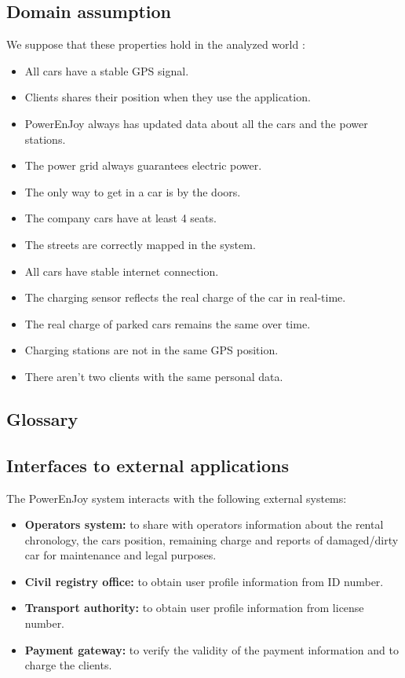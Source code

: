 \subsection{Domain assumption}
We suppose that these properties hold in the analyzed world :
\begin{itemize}
\item All cars have a stable GPS signal.
\item Clients shares their position when they use the application.
\item PowerEnJoy always has updated data about all the cars and the power stations.
\item The power grid always guarantees electric power.
\item The only way to get in a car is by the doors.
\item The company cars have at least 4 seats.
\item The streets are correctly mapped in the system.
\item All cars have stable internet connection.
\item The charging sensor reflects the real charge of the car in real-time.
\item The real charge of parked cars remains the same over time. 
\item Charging stations are not in the same GPS position.
\item There aren't two clients with the same  personal data.
\end{itemize}

\newpage

\subsection{Glossary}


\subsection{Interfaces to external applications}
The PowerEnJoy system interacts with the following external systems:
\begin{itemize}
\item \textbf{Operators system:} to share with operators information about the rental chronology, the cars position, remaining charge and  reports of damaged/dirty car for maintenance and legal purposes. 
\item  \textbf{Civil registry office:} to obtain user profile information from ID number.
\item \textbf{Transport authority:}  to obtain user profile information from license number.
\item \textbf{Payment gateway:} to verify the validity of the payment information and to charge the clients. 
\end{itemize}


